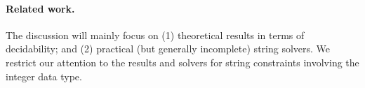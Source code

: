 
%
%
%
%
%
 

\paragraph*{Related work.}
The discussion will mainly focus on (1) theoretical results in terms of decidability; %
and (2) practical (but generally incomplete) string solvers.  We restrict our attention to the results and solvers for string constraints involving the integer data type.

